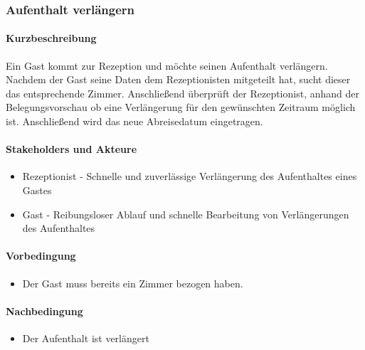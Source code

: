 \subsubsection{Aufenthalt verlängern}
\label{UseCase_AufenthaltVerlängern}

\paragraph{Kurzbeschreibung}
Ein \Gls{Gast} kommt zur \Gls{Rezeption} und möchte seinen \Gls{Aufenthalt} verlängern. Nachdem der \Gls{Gast} seine Daten dem \Gls{Rezeptionist}en mitgeteilt hat, sucht dieser das entsprechende Zimmer. Anschließend überprüft der \Gls{Rezeptionist}, anhand der \Gls{Belegungsvorschau} ob eine Verlängerung für den gewünschten Zeitraum möglich ist. Anschließend wird das neue Abreisedatum eingetragen.

\paragraph{Stakeholders und Akteure}
\begin{itemize}
\item \Gls{Rezeptionist} - Schnelle und zuverlässige Verlängerung des \Gls{Aufenthalt}es eines \Gls{Gast}es
\item \Gls{Gast} - Reibungsloser Ablauf und schnelle Bearbeitung von Verlängerungen des \Gls{Aufenthalt}es
\end{itemize}

\paragraph{Vorbedingung}
\begin{itemize}
\item Der \Gls{Gast} muss bereits ein \Gls{Zimmer} bezogen haben.
\end{itemize}

\paragraph{Nachbedingung}
\begin{itemize}
	\item Der \Gls{Aufenthalt} ist verlängert
\end{itemize}

